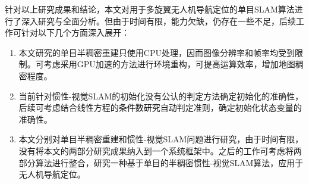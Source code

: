\begin{conclusion}
针对以上研究成果和结论，本文对用于多旋翼无人机导航定位的单目SLAM算法进行了深入研究与全面分析。但由于时间有限，能力欠缺，仍存在一些不足，后续工作可针对以下几个方面深入展开：
\begin{enumerate}  [label={(\arabic*)}]
\item 本文研究的单目半稠密重建只使用CPU处理，因而图像分辨率和帧率均受到限制。可考虑采用GPU加速的方法进行环境重构，可提高运算效率，增加地图稠密程度。
\item 当前针对惯性-视觉SLAM的初始化没有公认的判定方法确定初始化的准确性，后续可考虑结合线性方程的条件数研究自动判定准则，确定初始化状态变量的准确性。
\item 本文分别对单目半稠密重建和惯性-视觉SLAM问题进行研究，由于时间有限，没有将本文的两部分研究成果纳入到一个系统框架中。之后的工作可考虑将两部分算法进行整合，研究一种基于单目的半稠密惯性-视觉SLAM算法，应用于无人机导航定位。
\end{enumerate}





\end{conclusion}